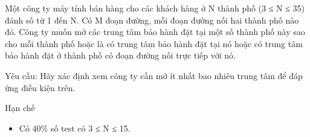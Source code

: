 Một công ty máy tính bán hàng cho các khách hàng ở N thành phố (3 ≤ N ≤ 35) đánh số từ 1 đến N. Có M đoạn đường, mỗi đoạn đường nối hai thành phố nào đó. Công ty muốn mở các trung tâm bảo hành đặt tại một số thành phố này sao cho mỗi thành phố hoặc là có trung tâm bảo hành đặt tại nó hoặc có trung tâm bảo hành đặt ở thành phố có đoạn đường nối trực tiếp với nó.  

   Yêu cầu: Hãy xác định xem công ty cần mở ít nhất bao nhiêu trung tâm để đáp ứng điều kiện trên.  

Hạn chế
\begin{itemize}
	\item     Có 40\% số test có 3 ≤ N ≤ 15.   
\end{itemize}